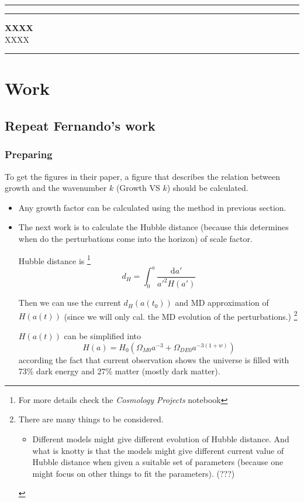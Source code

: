 



\newpage    %
\hrule\vspace{1pt}\hrule
\begin{center}
\mbox{{\bf XXXX}} \\
\vspace{0.5em}
\mbox{{XXXX}}
\end{center}
\hrule



\section{Work}

\subsection{Repeat Fernando's work}

\subsubsection{Preparing}

To get the figures in their paper, a figure that describes the relation between growth and the wavenumber $k$ (Growth VS $k$) should be calculated.

\begin{itemize}
\item
Any growth factor can be calculated using the method in previous section.

\item
The next work is to calculate the Hubble distance (because this determines when do the perturbations come into the horizon) of scale factor.

Hubble distance is 
\footnote{
For more details check the {\it Cosmology Projects} notebook}
\begin{equation}
d_H=\int^{a}_{0}{ \frac{\mathrm d a'}{a'^2H(a')} }
\end{equation}

Then we can use the current $d_H(a(t_0))$ and MD approximation of $H(a(t))$ (since we will only cal. the MD evolution of the perturbations.) 
\footnote{
There are many things to be considered. 
\begin{itemize}
\item 
Different models might give different evolution of Hubble distance. And what is knotty is that the models might give different current value of Hubble distance when given a suitable set of parameters (because one might focus on other things to fit the parameters). (???) 

\end{itemize}}

$H(a(t))$ can be simplified into 
\begin{equation}
H(a)=H_0 (\Omega_{M0}a^{-3}+\Omega_{DE0}a^{-3(1+w)})
\end{equation}
according the fact that current observation shows the universe is filled with 73\% dark energy and 27\% matter (mostly dark matter).

\end{itemize}


